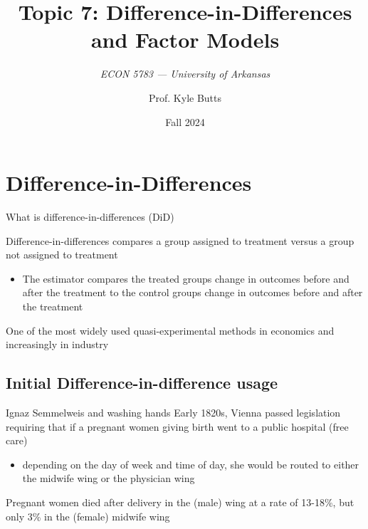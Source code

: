 \documentclass[aspectratio=169,t,11pt,table]{beamer}
\title{Topic 7: Difference-in-Differences and Factor Models}
\subtitle{\it  ECON 5783 — University of Arkansas}
\date{Fall 2024}
\author{Prof. Kyle Butts}
\begin{document}
\begin{frame}
\maketitle

\end{frame}


\section{Difference-in-Differences}

\begin{frame}{What is difference-in-differences (DiD)}

  \alert{Difference-in-differences} compares a group assigned to treatment versus a group not assigned to treatment
  \begin{itemize}
    \item The estimator compares the treated groups change in outcomes before and after the treatment to the control groups change in outcomes before and after the treatment
  \end{itemize}

  \bigskip
  One of the most widely used quasi-experimental methods in economics and increasingly in industry

\end{frame}

\subsection{Initial Difference-in-difference usage}

\begin{frame}{Ignaz Semmelweis and washing hands}
  Early 1820s, Vienna passed legislation requiring that if a pregnant
  women giving birth went to a public hospital (free care)
  \begin{itemize}
    \item depending on the day of week and time of day, she would be routed
    to either the midwife wing or the physician wing
  \end{itemize}
  
  \bigskip
  Pregnant women died after delivery in the (male) wing at a rate of 13-18\%, but only 3\% in the (female) midwife wing
\end{frame}
\end{document}
